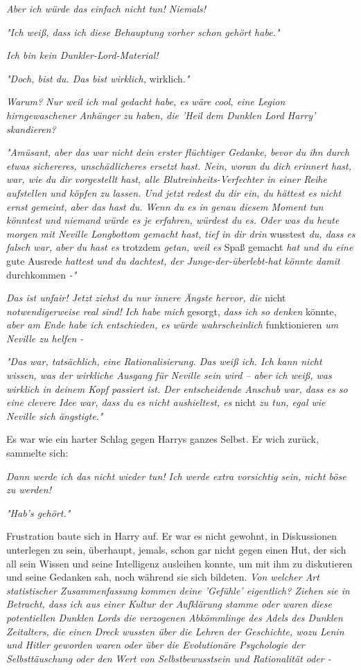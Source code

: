 {\emph{Aber ich würde das einfach nicht tun! Niemals!}

\emph{"Ich weiß, dass ich diese Behauptung vorher schon gehört habe."}

\emph{Ich bin kein Dunkler-Lord-Material!}

\emph{"Doch, bist du. Das bist wirklich,} wirklich.\emph{"}

\emph{Warum? Nur weil ich mal gedacht habe, es wäre cool, eine Legion hirngewaschener Anhänger zu haben, die 'Heil dem Dunklen Lord Harry' skandieren?}

\emph{"Amüsant, aber das war nicht dein erster flüchtiger Gedanke, bevor du ihn durch etwas sichereres, unschädlicheres ersetzt hast. Nein, woran du dich} \emph{erinnert hast, war, wie du dir vorgestellt hast, alle Blutreinheits-Verfechter in einer Reihe aufstellen und köpfen zu lassen. Und jetzt redest du dir ein, du hättest es nicht ernst gemeint, aber das hast du. Wenn du es in genau diesem Moment tun könntest und niemand würde es je erfahren, würdest du es. Oder was du heute morgen mit Neville Longbottom gemacht hast, tief in dir drin} wusstest \emph{du, dass es falsch war, aber du hast es} trotzdem \emph{getan, weil es} Spaß gemacht \emph{hat und du eine} gute Ausrede \emph{hattest und du dachtest, der Junge-der-überlebt-hat könnte damit} durchkommen \emph{-"}

\emph{Das ist unfair! Jetzt ziehst du nur innere Ängste hervor, die} nicht \emph{notwendigerweise real sind! Ich habe mich} gesorgt, \emph{dass ich so denken} könnte, \emph{aber am Ende habe ich entschieden, es würde wahrscheinlich} funktionieren \emph{um Neville zu helfen -}

\emph{"Das war, tatsächlich, eine Rationalisierung. Das weiß ich. Ich kann nicht wissen, was der wirkliche Ausgang für Neville sein wird -- aber ich weiß, was wirklich in deinem Kopf passiert ist. Der entscheidende Anschub war, dass es so eine clevere Idee war, dass du es nicht aushieltest, es} nicht \emph{zu tun, egal wie Neville sich ängstigte."}

Es war wie ein harter Schlag gegen Harrys ganzes Selbst. Er wich zurück, sammelte sich:

\emph{Dann werde ich das nicht wieder tun! Ich werde extra vorsichtig sein, nicht böse zu werden!}

\emph{"Hab's gehört."}

Frustration baute sich in Harry auf. Er war es nicht gewohnt, in Diskussionen unterlegen zu sein, überhaupt, jemals, schon gar nicht gegen einen Hut, der sich all sein Wissen und seine Intelligenz ausleihen konnte, um mit ihm zu diskutieren und seine Gedanken sah, noch während sie sich bildeten. \emph{Von welcher Art statistischer Zusammenfassung kommen deine 'Gefühle' eigentlich? Ziehen sie in Betracht, dass ich aus einer Kultur der Aufklärung stamme oder waren diese potentiellen Dunklen Lords die verzogenen Abkömmlinge des Adels des Dunklen Zeitalters, die einen Dreck wussten über die Lehren der Geschichte, wozu Lenin und Hitler geworden waren oder über die Evolutionäre Psychologie der Selbsttäuschung oder den Wert von Selbstbewusstsein und Rationalität oder -}

}
